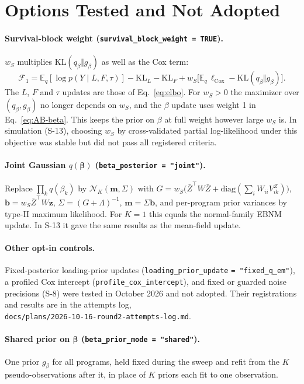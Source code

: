 \documentclass[11pt]{article}
\newcommand{\E}{\mathbb{E}_q}
\newcommand{\KL}{\mathrm{KL}}
\newcommand{\ws}{w_S}
\begin{document}
\section{Options Tested and Not Adopted}\label{app:options}

\paragraph{Survival-block weight (\texttt{survival\_block\_weight = TRUE}).}
$\ws$ multiplies $\KL(q_\beta\Vert g_\beta)$ as well as the Cox term:
\[
  \mathcal F_1 = \E[\log p(Y\mid L,F,\tau)] - \KL_L - \KL_F
  + \ws\bigl[\E\,\ell_{\text{Cox}} - \KL(q_\beta\Vert g_\beta)\bigr].
\]
The $L$, $F$ and $\tau$ updates are those of Eq.~\eqref{eq:elbo}. For $\ws > 0$
the maximizer over $(q_\beta, g_\beta)$ no longer depends on $\ws$, and the
$\beta$ update uses weight 1 in Eq.~\eqref{eq:AB-beta}. This keeps the prior on
$\beta$ at full weight however large $\ws$ is. In simulation (S-13), choosing
$\ws$ by cross-validated partial log-likelihood under this objective was stable
but did not pass all registered criteria.

\paragraph{Joint Gaussian $q(\bm\beta)$ (\texttt{beta\_posterior = "joint"}).}
Replace $\prod_k q(\beta_k)$ by $\mathcal N_K(\bm m,\Sigma)$ with
$G = \ws\bigl(\bar Z^\top W\bar Z + \mathrm{diag}(\sum_i W_{ii}V^Z_{ik})\bigr)$,
$\bm b = \ws\bar Z^\top W\bm z$, $\Sigma = (G+\Lambda)^{-1}$, $\bm m = \Sigma\bm b$,
and per-program prior variances by type-II maximum likelihood. For $K = 1$ this
equals the normal-family EBNM update. In S-13 it gave the same results as the
mean-field update.

\sloppy
\paragraph{Other opt-in controls.} Fixed-posterior loading-prior updates
(\texttt{loading\_prior\_update} \texttt{= "fixed\_q\_em"}), a profiled Cox intercept
(\texttt{profile\_cox\_intercept}), and fixed or guarded noise precisions (S-8)
were tested in October 2026 and not adopted. Their registrations and results are
in the attempts log,\\ \texttt{docs/plans/2026-10-16-round2-attempts-log.md}.

\paragraph{Shared prior on $\bm\beta$ (\texttt{beta\_prior\_mode = "shared"}).}
One prior $g_\beta$ for all programs, held fixed during the sweep and refit from
the $K$ pseudo-observations after it, in place of $K$ priors each fit to one
observation.
\end{document}
